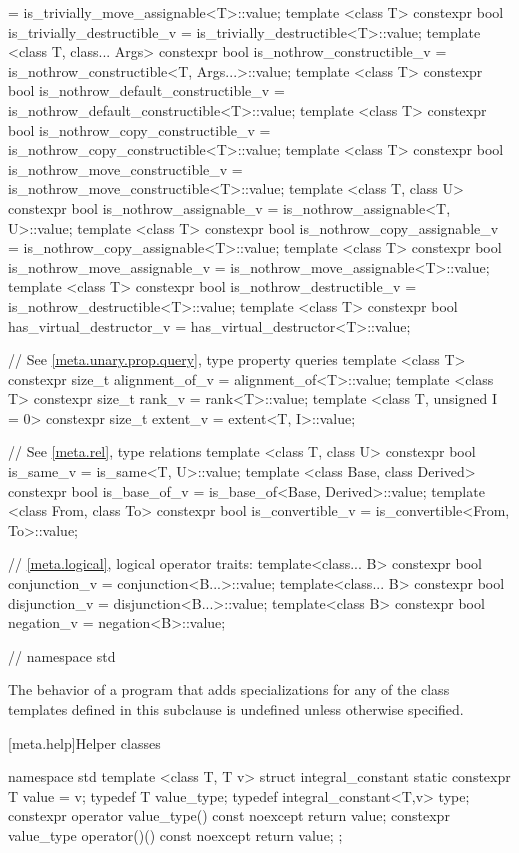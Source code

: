 \begin{codeblock}
{    = is_trivially_move_assignable<T>::value;
  template <class T> constexpr bool is_trivially_destructible_v
    = is_trivially_destructible<T>::value;
  template <class T, class... Args> constexpr bool is_nothrow_constructible_v
    = is_nothrow_constructible<T, Args...>::value;
  template <class T> constexpr bool is_nothrow_default_constructible_v
    = is_nothrow_default_constructible<T>::value;
  template <class T> constexpr bool is_nothrow_copy_constructible_v
    = is_nothrow_copy_constructible<T>::value;
  template <class T> constexpr bool is_nothrow_move_constructible_v
    = is_nothrow_move_constructible<T>::value;
  template <class T, class U> constexpr bool is_nothrow_assignable_v
    = is_nothrow_assignable<T, U>::value;
  template <class T> constexpr bool is_nothrow_copy_assignable_v
    = is_nothrow_copy_assignable<T>::value;
  template <class T> constexpr bool is_nothrow_move_assignable_v
    = is_nothrow_move_assignable<T>::value;
  template <class T> constexpr bool is_nothrow_destructible_v
    = is_nothrow_destructible<T>::value;
  template <class T> constexpr bool has_virtual_destructor_v
    = has_virtual_destructor<T>::value;

  // See \ref{meta.unary.prop.query}, type property queries
  template <class T> constexpr size_t alignment_of_v
    = alignment_of<T>::value;
  template <class T> constexpr size_t rank_v
    = rank<T>::value;
  template <class T, unsigned I = 0> constexpr size_t extent_v
    = extent<T, I>::value;

  // See \ref{meta.rel}, type relations
  template <class T, class U> constexpr bool is_same_v
    = is_same<T, U>::value;
  template <class Base, class Derived> constexpr bool is_base_of_v
    = is_base_of<Base, Derived>::value;
  template <class From, class To> constexpr bool is_convertible_v
    = is_convertible<From, To>::value;

  // \ref{meta.logical}, logical operator traits:
  template<class... B> constexpr bool conjunction_v = conjunction<B...>::value;
  template<class... B> constexpr bool disjunction_v = disjunction<B...>::value;
  template<class B> constexpr bool negation_v = negation<B>::value;
} // namespace std
\end{codeblock}

\pnum
The behavior of a program that adds specializations for any of
the class templates defined in this subclause is undefined unless otherwise specified.

[meta.help]{Helper classes}

\begin{codeblock}
namespace std {
  template <class T, T v>
  struct integral_constant {
    static constexpr T value = v;
    typedef T value_type;
    typedef integral_constant<T,v> type;
    constexpr operator value_type() const noexcept { return value; }
    constexpr value_type operator()() const noexcept { return value; }
  };
}
\end{codeblock}

